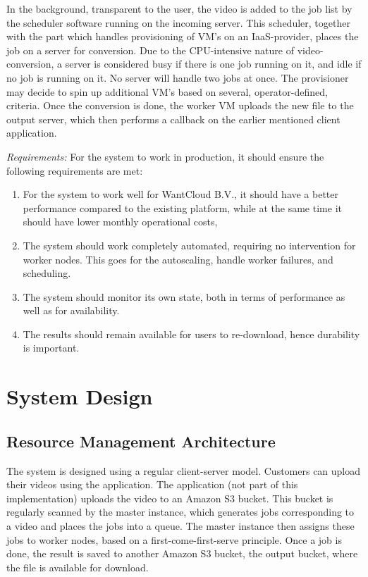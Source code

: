 \documentclass[a4paper]{IEEEtran}
\begin{document}
In the background, transparent to the user, the video is added to the job list by the scheduler software running on the incoming server.
This scheduler, together with the part which handles provisioning of VM's on an IaaS-provider, places the job on a server for conversion.
Due to the CPU-intensive nature of video-conversion, a server is considered busy if there is one job running on it, and idle if no job is running on it. 
No server will handle two jobs at once.
The provisioner may decide to spin up additional VM's based on several, operator-defined, criteria.
Once the conversion is done, the worker VM uploads the new file to the output server, which then performs a callback on the earlier mentioned client application.

\textit{Requirements:} For the system to work in production, it should ensure the following requirements are met:

\begin{enumerate}
\item For the system to work well for WantCloud B.V., it should have a better performance compared to the existing platform, while at the same time it should have lower monthly operational costs,
\item The system should work completely automated, requiring no intervention for worker nodes. This goes for the autoscaling, handle worker failures, and scheduling.
\item The system should monitor its own state, both in terms of performance as well as for availability.
\item The results should remain available for users to re-download, hence durability is important.
\end{enumerate}


\section{System Design}

\subsection{Resource Management Architecture}

The system is designed using a regular client-server model.
Customers can upload their videos using the application.
The application (not part of this implementation) uploads the video to an Amazon S3 bucket.
This bucket is regularly scanned by the master instance, which generates jobs corresponding to a video and places the jobs into a queue.
The master instance then assigns these jobs to worker nodes, based on a first-come-first-serve principle.
Once a job is done, the result is saved to another Amazon S3 bucket, the output bucket, where the file is available for download.
\end{document}
